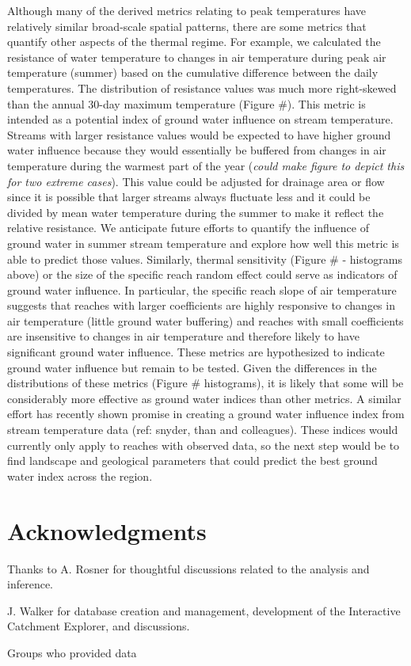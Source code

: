 \documentclass[]{article}
\begin{document}
Although many of the derived metrics relating to peak temperatures have
relatively similar broad-scale spatial patterns, there are some metrics
that quantify other aspects of the thermal regime. For example, we
calculated the resistance of water temperature to changes in air
temperature during peak air temperature (summer) based on the cumulative
difference between the daily temperatures. The distribution of
resistance values was much more right-skewed than the annual 30-day
maximum temperature (Figure \#). This metric is intended as a potential
index of ground water influence on stream temperature. Streams with
larger resistance values would be expected to have higher ground water
influence because they would essentially be buffered from changes in air
temperature during the warmest part of the year (\emph{could make figure
to depict this for two extreme cases}). This value could be adjusted for
drainage area or flow since it is possible that larger streams always
fluctuate less and it could be divided by mean water temperature during
the summer to make it reflect the relative resistance. We anticipate
future efforts to quantify the influence of ground water in summer
stream temperature and explore how well this metric is able to predict
those values. Similarly, thermal sensitivity (Figure \# - histograms
above) or the size of the specific reach random effect could serve as
indicators of ground water influence. In particular, the specific reach
slope of air temperature suggests that reaches with larger coefficients
are highly responsive to changes in air temperature (little ground water
buffering) and reaches with small coefficients are insensitive to
changes in air temperature and therefore likely to have significant
ground water influence. These metrics are hypothesized to indicate
ground water influence but remain to be tested. Given the differences in
the distributions of these metrics (Figure \# histograms), it is likely
that some will be considerably more effective as ground water indices
than other metrics. A similar effort has recently shown promise in
creating a ground water influence index from stream temperature data
(ref: snyder, than and colleagues). These indices would currently only
apply to reaches with observed data, so the next step would be to find
landscape and geological parameters that could predict the best ground
water index across the region.

\section{Acknowledgments}\label{acknowledgments}

Thanks to A. Rosner for thoughtful discussions related to the analysis
and inference.

J. Walker for database creation and management, development of the
Interactive Catchment Explorer, and discussions.

Groups who provided data

\renewcommand\refname{Literature Cited}

\end{document}
